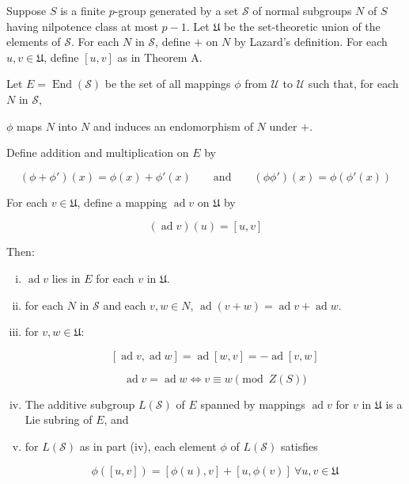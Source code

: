 \documentclass{ucetd}
\begin{document}
\begin{theorem}
  Suppose $S$ is a finite $p$-group generated by a set $\mathcal{S}$
  of normal subgroups $N$ of $S$ having nilpotence class at most $p -
  1$. Let $\mathfrak{U}$ be the set-theoretic union of the elements of
  $\mathcal{S}$. For each $N$ in $\mathcal{S}$, define $+$ on $N$ by
  Lazard's definition. For each $u,v \in \mathfrak{U}$, define $[u,v]$
  as in Theorem A.

  Let $E = \operatorname{End}(\mathcal{S})$ be the set of all mappings
  $\phi$ from $\mathcal{U}$ to $\mathcal{U}$ such that, for each $N$
  in $\mathcal{S}$,

  $\phi$ maps $N$ into $N$ and induces an endomorphism of $N$ under
  $+$.

  Define addition and multiplication on $E$ by

  $$(\phi + \phi')(x) = \phi(x) + \phi'(x) \qquad \text{and} \qquad (\phi \phi')(x) = \phi(\phi'(x))$$

  For each $v \in \mathfrak{U}$, define a mapping $\operatorname{ad}
  v$ on $\mathfrak{U}$ by

  $$(\operatorname{ad} v)(u) = [u,v]$$

  Then:

  \begin{enumerate}[(i)]
  \item $\operatorname{ad} v$ lies in $E$ for each $v$ in
    $\mathfrak{U}$.
  \item for each $N$ in $\mathcal{S}$ and each $v,w \in N$,
    $\operatorname{ad}(v + w) = \operatorname{ad} v +
    \operatorname{ad} w$.
  \item for $v,w \in \mathfrak{U}$:

    $$[\operatorname{ad} v, \operatorname{ad} w] = \operatorname{ad}[w,v] = -\operatorname{ad}[v,w]$$
    
    $$\operatorname{ad} v = \operatorname{ad} w \iff v \equiv w \pmod{Z(S)}$$
  \item The additive subgroup $L(\mathcal{S})$ of $E$ spanned by
    mappings $\operatorname{ad} v$ for $v$ in $\mathfrak{U}$ is a Lie
    subring of $E$, and
  \item for $L(\mathcal{S})$ as in part (iv), each element $\phi$ of
    $L(\mathcal{S})$ satisfies

    $$\phi([u,v]) = [\phi(u),v] + [u,\phi(v)] \ \forall u,v \in \mathfrak{U}$$
  \end{enumerate}
\end{theorem}
\end{document}

